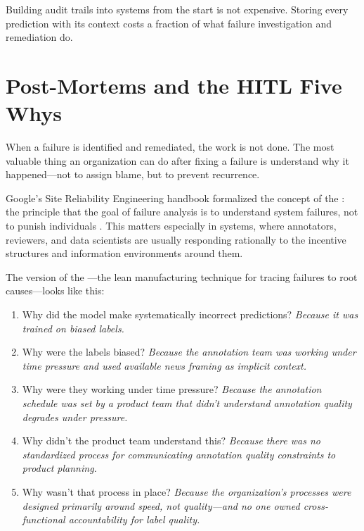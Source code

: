Building audit trails into \hitl systems from the start is not expensive. Storing every prediction with its context costs a fraction of what failure investigation and remediation do.

\section{Post-Mortems and the HITL Five Whys}
\label{sec:post-mortems}

When a \hitl failure is identified and remediated, the work is not done. The most valuable thing an organization can do after fixing a failure is understand why it happened---not to assign blame, but to prevent recurrence.

Google's Site Reliability Engineering handbook formalized the concept of the : the principle that the goal of failure analysis is to understand system failures, not to punish individuals \autocite{beyer2016sre}. This matters especially in \hitl systems, where annotators, reviewers, and data scientists are usually responding rationally to the incentive structures and information environments around them.

The \hitl version of the ---the lean manufacturing technique for tracing failures to root causes---looks like this:

\begin{enumerate}
    \item Why did the model make systematically incorrect predictions? \textit{Because it was trained on biased labels.}
    \item Why were the labels biased? \textit{Because the annotation team was working under time pressure and used available news framing as implicit context.}
    \item Why were they working under time pressure? \textit{Because the annotation schedule was set by a product team that didn't understand annotation quality degrades under pressure.}
    \item Why didn't the product team understand this? \textit{Because there was no standardized process for communicating annotation quality constraints to product planning.}
    \item Why wasn't that process in place? \textit{Because the organization's \hitl processes were designed primarily around speed, not quality---and no one owned cross-functional accountability for label quality.}
\end{enumerate}


